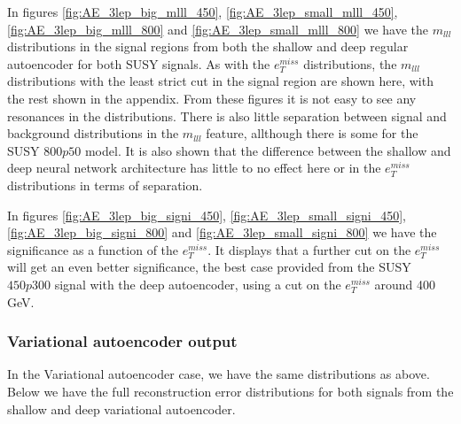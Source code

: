 In figures \ref{fig:AE_3lep_big_mlll_450}, \ref{fig:AE_3lep_small_mlll_450}, \ref{fig:AE_3lep_big_mlll_800} and  
\ref{fig:AE_3lep_small_mlll_800} we have the  $m_{lll}$ distributions in the signal 
regions from both the shallow and deep regular 
autoencoder for both SUSY signals. As with the $e_T^{miss}$ distributions, the $m_{lll}$ distributions 
with the least strict cut in the signal region 
are shown here, with the rest shown in the appendix. From these figures it is not easy to see any resonances 
in the distributions. There is also little separation between signal and background distributions in 
the $m_{lll}$ feature, allthough there is some for the SUSY $800p50$ model. It is also 
shown that the difference between the shallow and deep neural network architecture has little to no effect 
here or in the $e_T^{miss}$ distributions in terms of separation.  \par 
In figures \ref{fig:AE_3lep_big_signi_450}, \ref{fig:AE_3lep_small_signi_450}, \ref{fig:AE_3lep_big_signi_800} and  
\ref{fig:AE_3lep_small_signi_800} we have the significance as a function of the $e_T^{miss}$. It displays that 
a further cut on the $e_T^{miss}$ will get an even better significance, the best case provided from the SUSY $450p300$
signal with the deep autoencoder, using a cut on the $e_T^{miss}$ around 400 GeV. 


\subsubsection*{Variational autoencoder output}
In the Variational autoencoder case, we have the same distributions as above. Below we have the full reconstruction 
error distributions for both signals from the shallow and deep variational autoencoder. 


